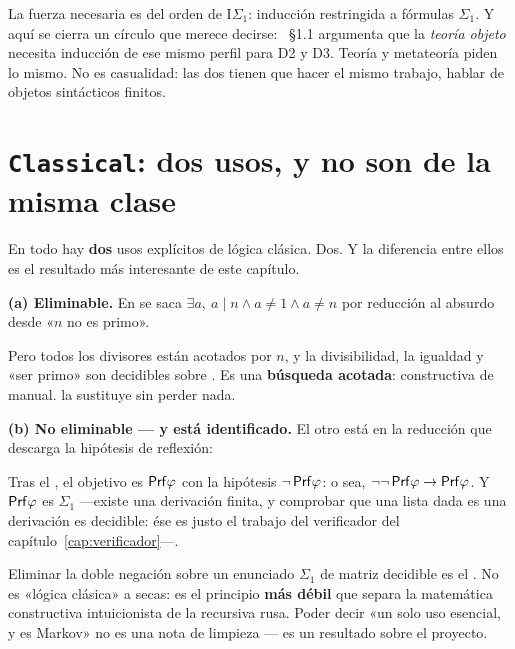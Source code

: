 La fuerza necesaria es del orden de $\mathrm{I}\Sigma_1$: inducción restringida a fórmulas
$\Sigma_1$. Y aquí se cierra un círculo que merece decirse: ~§1.1 argumenta que la
\emph{teoría objeto} necesita inducción de ese mismo perfil para D2 y D3. Teoría y metateoría
piden lo mismo. No es casualidad: las dos tienen que hacer el mismo trabajo, hablar de objetos
sintácticos finitos.

\section{\texorpdfstring{\texttt{Classical}}{Classical}: dos usos, y no son de la misma clase}

En todo  hay \textbf{dos} usos explícitos de lógica clásica. Dos. Y la
diferencia entre ellos es el resultado más interesante de este capítulo.

\textbf{(a) Eliminable.} En  se saca
$\exists a,\ a \mid n \wedge a \neq 1 \wedge a \neq n$ por reducción al absurdo desde
«$n$ no es primo».


Pero todos los divisores están acotados por $n$, y la divisibilidad, la igualdad y «ser primo» son
decidibles sobre . Es una \textbf{búsqueda acotada}: constructiva de manual.
 la sustituye sin perder nada.

\textbf{(b) No eliminable — y está identificado.} El otro está en la reducción que descarga la
hipótesis de reflexión:


Tras el , el objetivo es $\mathsf{Prf}\varphi$ con la hipótesis $\neg\,\mathsf{Prf}\varphi$: o sea,
$\neg\neg\,\mathsf{Prf}\varphi \to \mathsf{Prf}\varphi$. Y $\mathsf{Prf}\varphi$ es $\Sigma_1$ —existe una derivación
finita, y comprobar que una lista dada es una derivación es decidible: ése es justo el trabajo del
verificador del capítulo~\ref{cap:verificador}—.

\begin{leccion}
Eliminar la doble negación sobre un enunciado $\Sigma_1$ de matriz decidible es el
. No es «lógica clásica» a secas: es el principio
\textbf{más débil} que separa la matemática constructiva intuicionista de la recursiva rusa. Poder
decir «un solo uso esencial, y es Markov» no es una nota de limpieza — es un resultado sobre el
proyecto.
\end{leccion}

